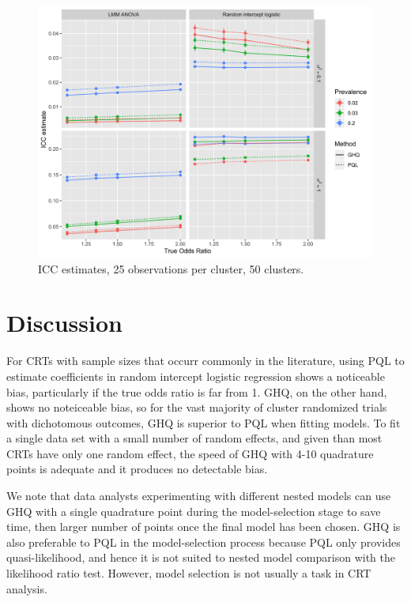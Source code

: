 \documentclass[Afour,times,sagev,doublespace]{sagej}
\begin{document}
\begin{figure}[]
\centering
\includegraphics[width=\linewidth]{_icc_p25_n50_both.png}
  \caption{ICC estimates, 25 observations per cluster, 50 clusters.}
    \label{fig:_icc}
\end{figure}


\section{Discussion}

For CRTs with sample sizes that occurr commonly in the literature, using PQL to estimate coefficients in random intercept logistic regression shows a noticeable bias, particularly if the true odds ratio is far from 1. GHQ, on the other hand, shows no noteiceable bias, so for the vast majority of cluster randomized trials with dichotomous outcomes, GHQ is superior to PQL when fitting models. To fit a single data set with a small number of random effects, and given than most CRTs have only one random effect, the speed of GHQ with 4-10 quadrature points is adequate and it produces no detectable bias.

We note that data analysts experimenting with different nested models can use GHQ with a single quadrature point during the model-selection stage to save time, then larger number of points once the final model has been chosen. GHQ is also preferable to PQL in the model-selection process because PQL only provides quasi-likelihood, and hence it is not suited to nested model comparison with the likelihood ratio test. However, model selection is not usually a task in CRT analysis.
\end{document}
